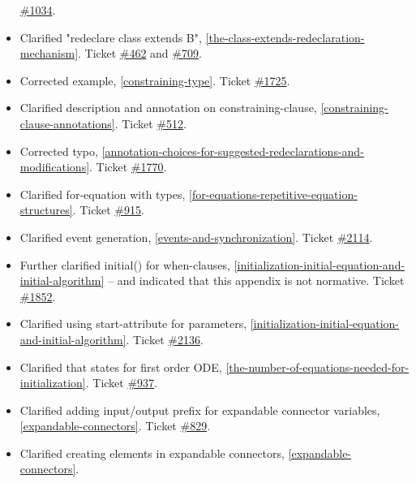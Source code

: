 \begin{itemize}
  \href{https://github.com/modelica/ModelicaSpecification/issues/1034}{\#1034}.
\item
  Clarified "redeclare class extends B", \autoref{the-class-extends-redeclaration-mechanism}. Ticket
  \href{https://github.com/modelica/ModelicaSpecification/issues/462}{\#462} and
  \href{https://github.com/modelica/ModelicaSpecification/issues/709}{\#709}.
\item
  Corrected example, \autoref{constraining-type}. Ticket
  \href{https://github.com/modelica/ModelicaSpecification/issues/1725}{\#1725}.
\item
  Clarified description and annotation on constraining-clause, \autoref{constraining-clause-annotations}. Ticket
  \href{https://github.com/modelica/ModelicaSpecification/issues/512}{\#512}.
\item
  Corrected typo, \autoref{annotation-choices-for-suggested-redeclarations-and-modifications}. Ticket
  \href{https://github.com/modelica/ModelicaSpecification/issues/1770}{\#1770}.
\item
  Clarified for-equation with types, \autoref{for-equations-repetitive-equation-structures}. Ticket
  \href{https://github.com/modelica/ModelicaSpecification/issues/915}{\#915}.
\item
  Clarified event generation, \autoref{events-and-synchronization}. Ticket
  \href{https://github.com/modelica/ModelicaSpecification/issues/2114}{\#2114}.
\item
  Further clarified initial() for when-clauses, \autoref{initialization-initial-equation-and-initial-algorithm} -- and
  indicated that this appendix is not normative. Ticket
  \href{https://github.com/modelica/ModelicaSpecification/issues/1852}{\#1852}.
\item
  Clarified using start-attribute for parameters, \autoref{initialization-initial-equation-and-initial-algorithm}. Ticket
  \href{https://github.com/modelica/ModelicaSpecification/issues/2136}{\#2136}.
\item
  Clarified that states for first order ODE, \autoref{the-number-of-equations-needed-for-initialization}. Ticket
  \href{https://github.com/modelica/ModelicaSpecification/issues/937}{\#937}.
\item
  Clarified adding input/output prefix for expandable connector
  variables, \autoref{expandable-connectors}. Ticket
  \href{https://github.com/modelica/ModelicaSpecification/issues/829}{\#829}.
\item
  Clarified creating elements in expandable connectors, \autoref{expandable-connectors}.

\end{itemize}
